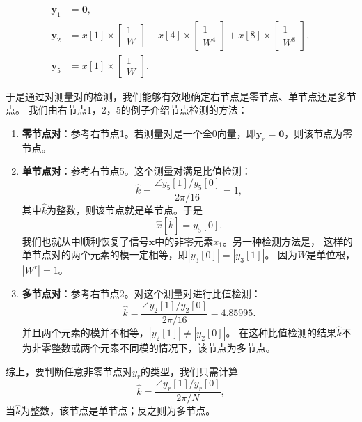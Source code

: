 \documentclass[AutoFakeBold]{LZUThesis}
\begin{document}
\begin{equation*}
    \begin{aligned}
        \mathbf{y}_1 &= \mathbf{0}, \\
        \mathbf{y}_2 &= x[1] \times 
        \left[
            \begin{array}{c}
                1 \\ W
            \end{array}
        \right] + x[4] \times 
        \left[
            \begin{array}{c}
                1 \\ W^4
            \end{array}
        \right] + x[8] \times
        \left[
            \begin{array}{c}
                1 \\ W^8
            \end{array}
        \right], \\
        \mathbf{y}_5 &= x[1] \times
        \left[
            \begin{array}{c}
                1 \\ W
            \end{array}
        \right]. 
    \end{aligned}
\end{equation*}

于是通过对测量对的检测，我们能够有效地确定右节点是零节点、单节点还是多节点。
我们由右节点1，2，5的例子介绍节点检测的方法：

\begin{enumerate}
    \item \textbf{零节点对}：参考右节点1。若测量对是一个全0向量，即$\mathbf{y}_r = \mathbf{0}$，则该节点为零节点。
    \item \textbf{单节点对}：参考右节点5。这个测量对满足比值检测：
        \begin{equation*}
            \hat{k} = \frac{\angle y_5[1] / y_5[0]}{2 \pi / 16} = 1, 
        \end{equation*}
        其中$\hat k$为整数，则该节点就是单节点。于是
        \begin{equation*}
            \hat x [\hat k] = y_5 [0]. 
        \end{equation*}
        我们也就从中顺利恢复了信号$\mathbf{x}$中的非零元素$x_1$。另一种检测方法是，
        这样的单节点对的两个元素的模一定相等，即$|y_3[0]| = |y_3[1]|$。
        因为$W$是单位根，$|W^r| = 1$。
    \item \textbf{多节点对}：参考右节点2。对这个测量对进行比值检测：
        \begin{equation*}
            \hat k = \frac{\angle y_2[1] / y_2[0]}{2 \pi / 16} = 4.85995. 
        \end{equation*}
        并且两个元素的模并不相等，$|y_2[1]| \neq |y_2[0]|$。
        在这种比值检测的结果$\hat k$不为非零整数或两个元素不同模的情况下，该节点为多节点。
\end{enumerate}
综上，要判断任意非零节点对$y_r$的类型，我们只需计算
\begin{equation}
    \label{k}
    \hat k = \frac{\angle y_r[1] / y_r[0]}{2 \pi / N},
\end{equation}
当$\hat k$为整数，该节点是单节点；反之则为多节点。
\end{document}
